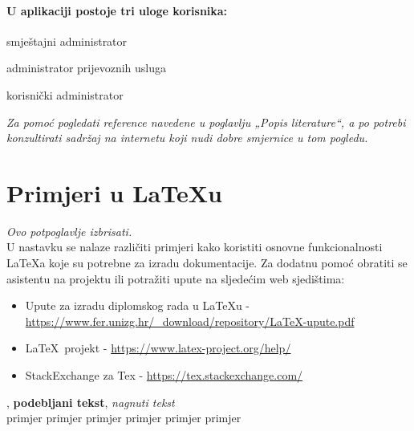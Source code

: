 		
		\paragraph{\textmd{U aplikaciji postoje tri uloge korisnika:}}
		\begin{packed_item}{}
			\item smještajni administrator
			\item administrator prijevoznih usluga
			\item korisnički administrator
		\end{packed_item}
		
		\textit{Za pomoć pogledati reference navedene u poglavlju „Popis literature“, a po potrebi konzultirati sadržaj na internetu koji nudi dobre smjernice u tom pogledu.}
		\eject
		
		\section{Primjeri u \LaTeX u}
		
		\textit{Ovo potpoglavlje izbrisati.}\\

		U nastavku se nalaze različiti primjeri kako koristiti osnovne funkcionalnosti \LaTeX a koje su potrebne za izradu dokumentacije. Za dodatnu pomoć obratiti se asistentu na projektu ili potražiti upute na sljedećim web sjedištima:
		\begin{itemize}
			\item Upute za izradu diplomskog rada u \LaTeX u - \url{https://www.fer.unizg.hr/_download/repository/LaTeX-upute.pdf}
			\item \LaTeX\ projekt - \url{https://www.latex-project.org/help/}
			\item StackExchange za Tex - \url{https://tex.stackexchange.com/}\\
		
		\end{itemize} 	


		
		\noindent {}, \textbf{podebljani tekst}, 	\textit{nagnuti tekst}\\
		\noindent \normalsize primjer \large primjer \Large primjer \LARGE {primjer} \huge {primjer} \Huge primjer \normalsize
				
